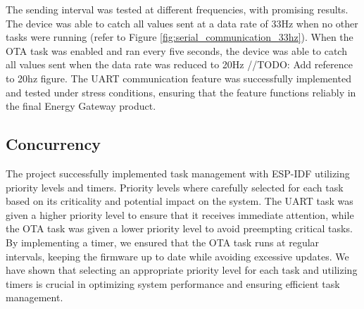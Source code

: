 The sending interval was tested at different frequencies, with promising results. The device was able to catch all values sent at a data rate of 33Hz when no other tasks were running (refer to Figure \ref{fig:serial_communication_33hz}). When the OTA task was enabled and ran every five seconds, the device was able to catch all values sent when the data rate was reduced to 20Hz //TODO: Add reference to 20hz figure. The UART communication feature was successfully implemented and tested under stress conditions, ensuring that the feature functions reliably in the final Energy Gateway product.

\subsection{Concurrency}

The project successfully implemented task management with ESP-IDF utilizing priority levels and timers. Priority levels where carefully selected for each task based on its criticality and potential impact on the system. The UART task was given a higher priority level to ensure that it receives immediate attention, while the OTA task was given a lower priority level to avoid preempting critical tasks. By implementing a timer, we ensured that the OTA task runs at regular intervals, keeping the firmware up to date while avoiding excessive updates. We have shown that selecting an appropriate priority level for each task and utilizing timers is crucial in optimizing system performance and ensuring efficient task management.